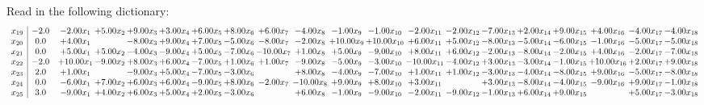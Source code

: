 \documentclass[9pt]{article}
\begin{document}
Read in the following dictionary:
\[\begin{array}{c| c c@{\hskip 2pt} c@{\hskip 2pt} c@{\hskip 2pt} c@{\hskip 2pt} c@{\hskip 2pt} c@{\hskip 2pt} c@{\hskip 2pt} c@{\hskip 2pt} c@{\hskip 2pt} c@{\hskip 2pt} c@{\hskip 2pt} c@{\hskip 2pt} c@{\hskip 2pt} c@{\hskip 2pt} c@{\hskip 2pt} c@{\hskip 2pt} c@{\hskip 2pt} c@{\hskip 2pt} }
 x_{19}   &  -2.0 & -2.00 x_{1} & +  5.00 x_{2} & +  9.00 x_{3} & +  3.00 x_{4} & +  6.00 x_{5} & +  8.00 x_{6} & +  6.00 x_{7} & -4.00 x_{8} & -1.00 x_{9} & -1.00 x_{10} & -2.00 x_{11} & -2.00 x_{12} & -7.00 x_{13} & +  2.00 x_{14} & +  9.00 x_{15} & +  4.00 x_{16} & -4.00 x_{17} & -4.00 x_{18}\\
 x_{20}   &  0.0 & +  4.00 x_{1} &   & -8.00 x_{3} & +  9.00 x_{4} & +  7.00 x_{5} & -5.00 x_{6} & -8.00 x_{7} & -2.00 x_{8} & + 10.00 x_{9} & + 10.00 x_{10} & +  6.00 x_{11} & +  5.00 x_{12} & -8.00 x_{13} & -5.00 x_{14} & -6.00 x_{15} & -1.00 x_{16} & -5.00 x_{17} & -5.00 x_{18}\\
 x_{21}   &  0.0 & +  5.00 x_{1} & +  5.00 x_{2} & -4.00 x_{3} & -9.00 x_{4} & +  5.00 x_{5} & -7.00 x_{6} & -10.00 x_{7} & +  1.00 x_{8} & +  5.00 x_{9} & -9.00 x_{10} & +  8.00 x_{11} & +  6.00 x_{12} & -2.00 x_{13} & -8.00 x_{14} & -2.00 x_{15} & +  4.00 x_{16} & -2.00 x_{17} & -7.00 x_{18}\\
 x_{22}   &  -2.0 & + 10.00 x_{1} & -9.00 x_{2} & +  8.00 x_{3} & +  6.00 x_{4} & -7.00 x_{5} & +  1.00 x_{6} & +  1.00 x_{7} & -9.00 x_{8} & -5.00 x_{9} & -3.00 x_{10} & -10.00 x_{11} & -4.00 x_{12} & +  3.00 x_{13} & -3.00 x_{14} & -1.00 x_{15} & + 10.00 x_{16} & +  2.00 x_{17} & +  9.00 x_{18}\\
 x_{23}   &  2.0 & +  1.00 x_{1} &   & -9.00 x_{3} & +  5.00 x_{4} & -7.00 x_{5} & -3.00 x_{6} &   & +  8.00 x_{8} & -4.00 x_{9} & -7.00 x_{10} & +  1.00 x_{11} & +  1.00 x_{12} & -3.00 x_{13} & -4.00 x_{14} & -8.00 x_{15} & +  9.00 x_{16} & -5.00 x_{17} & -8.00 x_{18}\\
 x_{24}   &  0.0 & -6.00 x_{1} & +  7.00 x_{2} & +  6.00 x_{3} & +  6.00 x_{4} & -9.00 x_{5} & +  8.00 x_{6} & -2.00 x_{7} & -10.00 x_{8} & +  9.00 x_{9} & +  8.00 x_{10} & +  3.00 x_{11} &   & +  3.00 x_{13} & -8.00 x_{14} & -4.00 x_{15} & -9.00 x_{16} & +  9.00 x_{17} & -1.00 x_{18}\\
 x_{25}   &  3.0 & -9.00 x_{1} & +  4.00 x_{2} & +  6.00 x_{3} & +  5.00 x_{4} & +  2.00 x_{5} & -3.00 x_{6} &   & +  6.00 x_{8} & -1.00 x_{9} & -9.00 x_{10} & -2.00 x_{11} & -9.00 x_{12} & -1.00 x_{13} & +  6.00 x_{14} & +  9.00 x_{15} &   & +  5.00 x_{17} & -3.00 x_{18}\\

\end{array}\]
\end{document}
